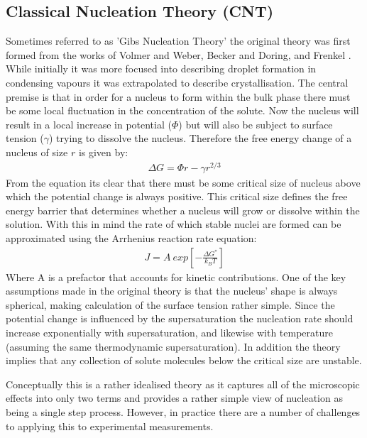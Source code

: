 \subsection{Classical Nucleation Theory (CNT)}
Sometimes referred to as 'Gibs Nucleation Theory' the original theory was first formed from the works of Volmer and Weber, Becker and Doring, and Frenkel \cite{Frenkel1939, Volmer1926}. While initially it was more focused into describing droplet formation in condensing vapours it was extrapolated to describe crystallisation. The central premise is that in order for a nucleus to form within the bulk phase there must be some local fluctuation in the concentration of the solute. Now the nucleus will result in a local increase in potential ($\Phi$) but will also be subject to surface tension ($\gamma$) trying to dissolve the nucleus. Therefore the free energy change of a nucleus of size $r$ is given by:
\begin{align}
	\Delta G = \Phi r - \gamma r^{2/3}
\end{align}
From the equation its clear that there must be some critical size of nucleus above which the potential change is always positive. This critical size defines the free energy barrier that determines whether a nucleus will grow or dissolve within the solution. With this in mind the rate of which stable nuclei are formed can be approximated using the Arrhenius reaction rate equation:
\begin{align}
	J = A \ exp \left[-\frac{\Delta G^*}{k_BT} \right]
\end{align}
Where A is a prefactor that accounts for kinetic contributions. One of the key assumptions made in the original theory is that the nucleus' shape is always spherical, making calculation of the surface tension rather simple. Since the potential change is influenced by the supersaturation the nucleation rate should increase exponentially with supersaturation, and likewise with temperature (assuming the same thermodynamic supersaturation). In addition the theory implies that any collection of solute molecules below the critical size are unstable.  

Conceptually this is a rather idealised theory as it captures all of the microscopic effects into only two terms and provides a rather simple view of nucleation as being a single step process. However, in practice there are a number of challenges to applying this to experimental measurements.

